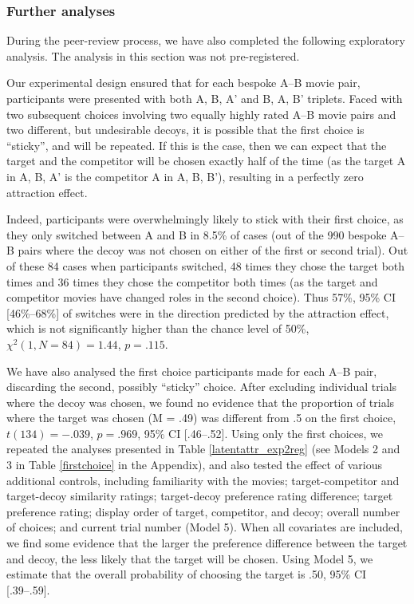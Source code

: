 \documentclass[12pt, a4paper]{article}
\begin{document}
\subsubsection*{Further analyses}

During the peer-review process, we have also completed the following exploratory analysis. The analysis in this section was not pre-registered.

Our experimental design ensured that for each bespoke A--B movie pair, participants were presented with both A, B, A' and B, A, B' triplets. Faced with two subsequent choices involving two equally highly rated A--B movie pairs and two different, but undesirable decoys, it is possible that the first choice is  ``sticky'', and will be repeated. If this is the case, then we can expect that the target and the competitor will be chosen exactly half of the time (as the target A in A, B, A' is the competitor A in A, B, B'), resulting in a perfectly zero attraction effect. 

Indeed, participants were overwhelmingly likely to stick with their first choice, as they only switched between A and B in 8.5\% of cases (out of the 990 bespoke A--B pairs where the decoy was not chosen on either of the first or second trial). Out of these 84 cases when participants switched, 48 times they chose the target both times and 36 times they chose the competitor both times (as the target and competitor movies have changed roles in the second choice). Thus 57\%, 95\% CI [46\%--68\%] of switches were in the direction predicted by the attraction effect, which is not significantly higher than the chance level of 50\%, ${\chi}^2(1, N = 84)=1.44$, $p=.115$. 

We have also analysed the first choice participants made for each A--B pair, discarding the second, possibly ``sticky'' choice.  
After excluding individual trials where the decoy was chosen, we found no evidence that the proportion of trials where the target was chosen (M = .49) was different from .5 on the first choice, $t(134)=-.039$, $p=.969$, 95\% CI [.46--.52]. Using only the first choices, we repeated the analyses presented in Table \ref{latentattr_exp2reg} (see Models 2 and 3 in Table \ref{firstchoice} in the Appendix), and also tested the effect of various additional controls, including familiarity with the movies; target-competitor and target-decoy similarity ratings; target-decoy preference rating difference; target preference rating; display order of target, competitor, and decoy; overall number of choices; and current trial number (Model 5). When all covariates are included, we find some evidence that the larger the preference difference between the target and decoy, the less likely that the target will be chosen. Using Model 5, we estimate that the overall probability of choosing the target is .50, 95\% CI [.39--.59]. 
\end{document}
